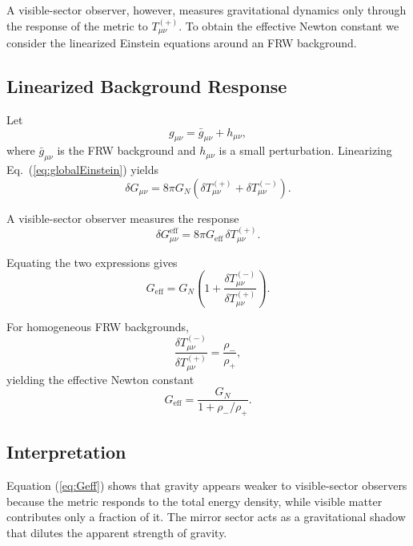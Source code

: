 \documentclass[11pt,a4paper]{article}
\begin{document}
A visible-sector observer, however, measures gravitational dynamics only through the response of the metric to $T_{\mu\nu}^{(+)}$. To obtain the effective Newton constant we consider the linearized Einstein equations around an FRW background.

\subsection{Linearized Background Response}

Let
\begin{equation}
g_{\mu\nu} = \bar{g}_{\mu\nu} + h_{\mu\nu},
\end{equation}
where $\bar{g}_{\mu\nu}$ is the FRW background and $h_{\mu\nu}$ is a small perturbation. Linearizing Eq.~(\ref{eq:globalEinstein}) yields
\begin{equation}
\delta G_{\mu\nu} = 8\pi G_N \left( \delta T_{\mu\nu}^{(+)} + \delta T_{\mu\nu}^{(-)} \right).
\end{equation}

A visible-sector observer measures the response
\begin{equation}
\delta G_{\mu\nu}^{\mathrm{eff}} = 8\pi G_{\mathrm{eff}} \, \delta T_{\mu\nu}^{(+)}.
\end{equation}

Equating the two expressions gives
\begin{equation}
G_{\mathrm{eff}} = G_N \left( 1 + \frac{\delta T_{\mu\nu}^{(-)}}{\delta T_{\mu\nu}^{(+)}} \right).
\end{equation}

For homogeneous FRW backgrounds,
\begin{equation}
\frac{\delta T_{\mu\nu}^{(-)}}{\delta T_{\mu\nu}^{(+)}} = \frac{\rho_-}{\rho_+},
\end{equation}
yielding the effective Newton constant
\begin{equation}
G_{\mathrm{eff}} = \frac{G_N}{1 + \rho_-/\rho_+}.
\label{eq:Geff}
\end{equation}

\subsection{Interpretation}

Equation (\ref{eq:Geff}) shows that gravity appears weaker to visible-sector observers because the metric responds to the total energy density, while visible matter contributes only a fraction of it. The mirror sector acts as a gravitational shadow that dilutes the apparent strength of gravity.
\end{document}
